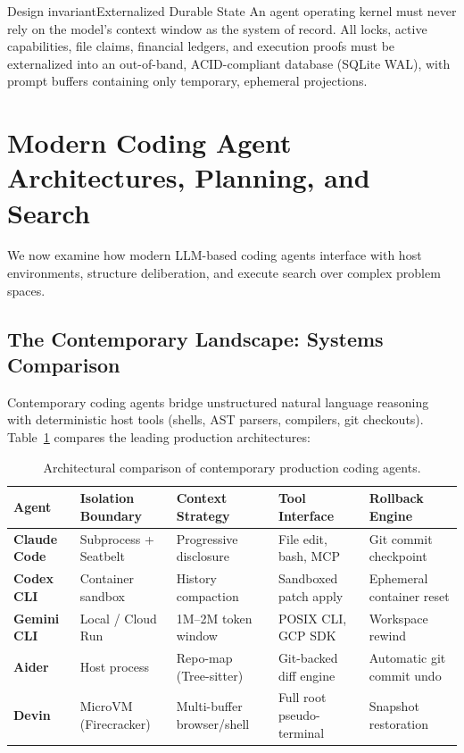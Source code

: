 \begin{pdclaim}{Design invariant}{Externalized Durable State}\label{req:external-state}
An agent operating kernel must never rely on the model's context window as the system of record. All locks, active capabilities, file claims, financial ledgers, and execution proofs must be externalized into an out-of-band, ACID-compliant database (SQLite WAL), with prompt buffers containing only temporary, ephemeral projections.
\end{pdclaim}

\section{Modern Coding Agent Architectures, Planning, and Search}\label{sec:prereq-coding-agents}

We now examine how modern LLM-based coding agents interface with host environments, structure deliberation, and execute search over complex problem spaces.

\subsection{The Contemporary Landscape: Systems Comparison}

Contemporary coding agents bridge unstructured natural language reasoning with deterministic host tools (shells, AST parsers, compilers, git checkouts). Table~\ref{tab:coding-agents} compares the leading production architectures:

\begin{table}[H]
\centering
\footnotesize
\setlength{\tabcolsep}{2.5pt}
\begin{tabularx}{\textwidth}{l >{\raggedright\arraybackslash}X >{\raggedright\arraybackslash}X >{\raggedright\arraybackslash}X >{\raggedright\arraybackslash}X}
\toprule
\textbf{Agent} & \textbf{Isolation Boundary} & \textbf{Context Strategy} & \textbf{Tool Interface} & \textbf{Rollback Engine} \\
\midrule
\textbf{Claude Code} & Subprocess + Seatbelt & Progressive disclosure & File edit, bash, MCP & Git commit checkpoint \\
\textbf{Codex CLI} & Container sandbox & History compaction & Sandboxed patch apply & Ephemeral container reset \\
\textbf{Gemini CLI} & Local / Cloud Run & 1M--2M token window & POSIX CLI, GCP SDK & Workspace rewind \\
\textbf{Aider} & Host process & Repo-map (Tree-sitter) & Git-backed diff engine & Automatic git commit undo \\
\textbf{Devin} & MicroVM (Firecracker) & Multi-buffer browser/shell & Full root pseudo-terminal & Snapshot restoration \\
\bottomrule
\end{tabularx}
\caption{Architectural comparison of contemporary production coding agents.}
\label{tab:coding-agents}
\end{table}

